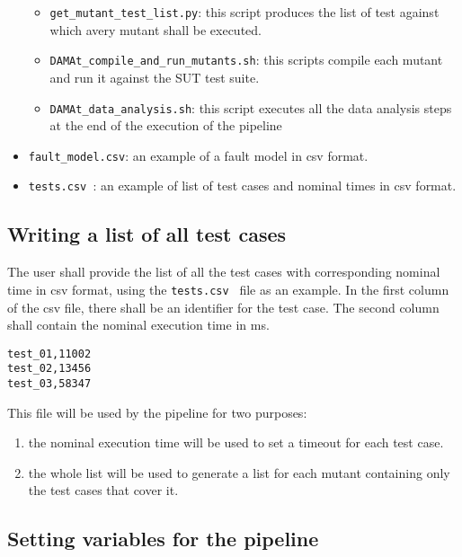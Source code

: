 \begin{itemize}
\begin{itemize}
		\item \texttt{get\_mutant\_test\_list.py}: this script produces the list of test against which avery mutant shall be executed.
	  \item \texttt{DAMAt\_compile\_and\_run\_mutants.sh}: this scripts compile each mutant and run it against the SUT test suite.
		\item \texttt{DAMAt\_data\_analysis.sh}: this script executes all the data analysis steps at the end of the execution of the \DAMA pipeline
	\end{itemize}
	\item \texttt{fault\_model.csv}: an example of a \DAMA fault model in csv format.
 	\item \texttt{tests.csv }: an example of list of test cases and nominal times in csv format.
\end{itemize}

\subsection{Writing a list of all test cases}
\label{subsec:test_list}
The user shall provide the list of all the test cases with corresponding nominal time in csv format, using the \texttt{tests.csv } file as an example.
In the first column of the csv file, there shall be an identifier for the test case. The second column shall contain the nominal execution time in ms.

\begin{lstlisting}
test_01,11002
test_02,13456
test_03,58347
\end{lstlisting}

This file will be used by the \DAMA pipeline for two purposes:
\begin{enumerate}
	\item the nominal execution time will be used to set a timeout for each test case.
	\item the whole list will be used to generate a list for each mutant containing only the test cases that cover it.
\end{enumerate}

\subsection{Setting variables for the \DAMA pipeline}


